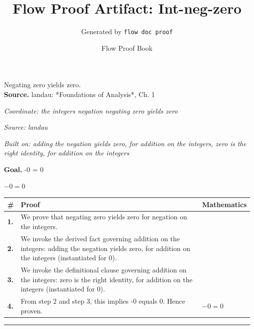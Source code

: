 \documentclass[11pt]{article}
\title{Flow Proof Artifact: Int-neg-zero}
\author{Generated by \texttt{flow doc proof}}
\date{Flow Proof Book}
\theoremstyle{definition}
\begin{document}
\maketitle
Negating zero yields zero.\\[0.5em]
\textbf{Source.} landau: *Foundations of Analysis*, Ch. 1\\[0.5em]
\bigskip
{}\par
\smallskip\noindent\textit{Coordinate: the integers \cdot negation \cdot negating zero yields zero}\par
\smallskip\noindent\textit{Source: landau}\par
\smallskip\noindent\textit{Built on: adding the negation yields zero, for addition on the integers, zero is the right identity, for addition on the integers}\par
\medskip
\noindent\textbf{Goal.} -0 = 0\par
\noindent$\displaystyle -0 = 0$\par
\medskip
\noindent
\begin{tabular}{@{} >{\raggedright\arraybackslash}p{} >{\raggedright\arraybackslash}p{} >{\raggedleft\arraybackslash}p{} @{}}
\textbf{\#} & \textbf{Proof} & \textbf{Mathematics} \\
\midrule
\textbf{1.} & We prove that negating zero yields zero for negation on the integers. & \\[0.45em]
\textbf{2.} & We invoke the derived fact governing addition on the integers: adding the negation yields zero, for addition on the integers (instantiated for 0). & \\[0.45em]
\textbf{3.} & We invoke the definitional clause governing addition on the integers: zero is the right identity, for addition on the integers (instantiated for 0). & \\[0.45em]
\textbf{4.} & From step 2 and step 3, this implies -0 equals 0. Hence proven. & $\displaystyle -0 = 0$ \\[0.45em]
\bottomrule
\end{tabular}
\label{thm:Int-negation-negating_zero_yields_zero}
\par\medskip\hrule
\end{document}
